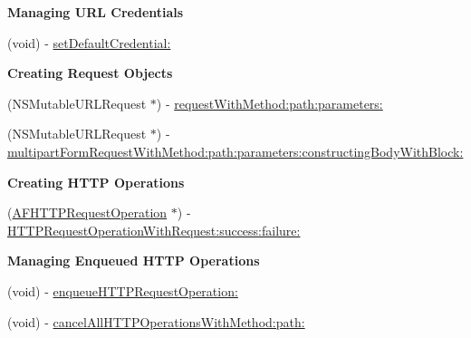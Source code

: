 \begin{Indent}{\bf Managing U\-R\-L Credentials}\par
{\em 

 

 }\begin{DoxyCompactItemize}
\item 
(void) -\/ \hyperlink{interface_a_f_h_t_t_p_client_aed7326d6b61996a8c78160bdd4d272c9}{set\-Default\-Credential\-:}
\end{DoxyCompactItemize}
\end{Indent}
\begin{Indent}{\bf Creating Request Objects}\par
{\em 

 

 }\begin{DoxyCompactItemize}
\item 
(N\-S\-Mutable\-U\-R\-L\-Request $\ast$) -\/ \hyperlink{interface_a_f_h_t_t_p_client_a67c6123e5bc7c1f60270accb38d6db49}{request\-With\-Method\-:path\-:parameters\-:}
\item 
(N\-S\-Mutable\-U\-R\-L\-Request $\ast$) -\/ \hyperlink{interface_a_f_h_t_t_p_client_ad1f8c3559b94a95d72e29e5e9f4b1a8d}{multipart\-Form\-Request\-With\-Method\-:path\-:parameters\-:constructing\-Body\-With\-Block\-:}
\end{DoxyCompactItemize}
\end{Indent}
\begin{Indent}{\bf Creating H\-T\-T\-P Operations}\par
{\em 

 

 }\begin{DoxyCompactItemize}
\item 
(\hyperlink{interface_a_f_h_t_t_p_request_operation}{A\-F\-H\-T\-T\-P\-Request\-Operation} $\ast$) -\/ \hyperlink{interface_a_f_h_t_t_p_client_a27c1fa330c1d30917bbb99a1dece8c53}{H\-T\-T\-P\-Request\-Operation\-With\-Request\-:success\-:failure\-:}
\end{DoxyCompactItemize}
\end{Indent}
\begin{Indent}{\bf Managing Enqueued H\-T\-T\-P Operations}\par
{\em 

 

 }\begin{DoxyCompactItemize}
\item 
(void) -\/ \hyperlink{interface_a_f_h_t_t_p_client_a6fcc6d3d97bfe620a6a689232509c23b}{enqueue\-H\-T\-T\-P\-Request\-Operation\-:}
\item 
(void) -\/ \hyperlink{interface_a_f_h_t_t_p_client_aed0be021f4ecbe61d58eb6fe76fea3c6}{cancel\-All\-H\-T\-T\-P\-Operations\-With\-Method\-:path\-:}
\end{DoxyCompactItemize}
\end{Indent}
